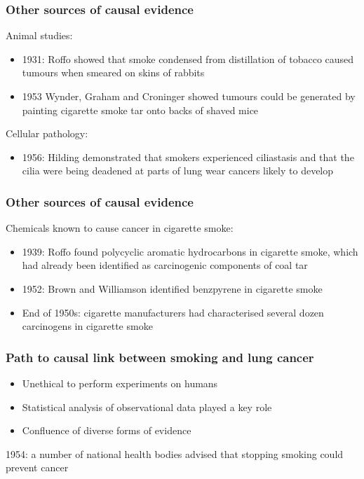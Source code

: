 \documentclass[handout]{beamer}
\begin{document}
\begin{frame}
	\frametitle{Other sources of causal evidence}
	
	Animal studies:
	\begin{itemize}
		\item 1931: Roffo showed that smoke condensed from distillation of tobacco caused tumours when smeared on skins of rabbits
		\item 1953 Wynder, Graham and Croninger showed tumours could be generated by painting cigarette smoke tar onto backs of shaved mice
	\end{itemize}
	
	Cellular pathology:
	\begin{itemize}
		\item 1956: Hilding demonstrated that smokers experienced ciliastasis and that the cilia were being deadened at parts of lung wear cancers likely to develop
	\end{itemize}
	
\end{frame}

\begin{frame}
	\frametitle{Other sources of causal evidence}
	
	Chemicals known to cause cancer in cigarette smoke:
	\begin{itemize}
		\item 1939: Roffo found polycyclic aromatic hydrocarbons in cigarette smoke, which had already been identified as carcinogenic components of coal tar
		\item 1952: Brown and Williamson identified benzpyrene in cigarette smoke
		\item End of 1950s: cigarette manufacturers had characterised several dozen carcinogens in cigarette smoke
	\end{itemize}
	
\end{frame}

\begin{frame}
	\frametitle{Path to causal link between smoking and lung cancer}
	
	\begin{itemize}
		\item Unethical to perform experiments on humans
		\item Statistical analysis of observational data played a key role
		\item Confluence of diverse forms of evidence
	\end{itemize}
	
	1954: a number of national health bodies advised that stopping smoking could prevent cancer
	
\end{frame}
\end{document}
